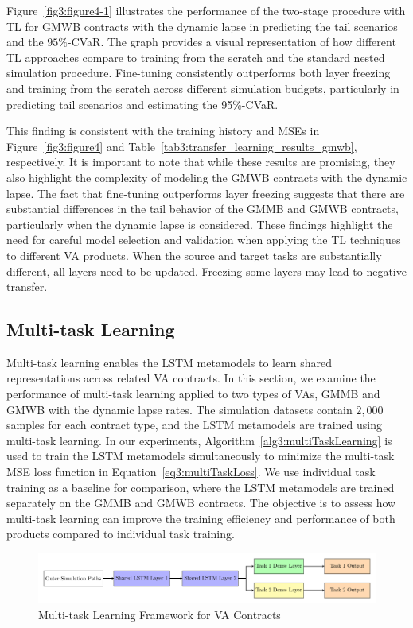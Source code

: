 Figure~\ref{fig3:figure4-1} illustrates the performance of the two-stage procedure with TL for GMWB contracts with the dynamic lapse in predicting the tail scenarios and the $95\%$-CVaR.
The graph provides a visual representation of how different TL approaches compare to training from the scratch and the standard nested simulation procedure.
Fine-tuning consistently outperforms both layer freezing and training from the scratch across different simulation budgets, particularly in predicting tail scenarios and estimating the 95\%-CVaR. 

This finding is consistent with the training history and MSEs in Figure~\ref{fig3:figure4} and Table~\ref{tab3:transfer_learning_results_gmwb}, respectively.
It is important to note that while these results are promising, they also highlight the complexity of modeling the GMWB contracts with the dynamic lapse. 
The fact that fine-tuning outperforms layer freezing suggests that there are substantial differences in the tail behavior of the GMMB and GMWB contracts, particularly when the dynamic lapse is considered. 
These findings highlight the need for careful model selection and validation when applying the TL techniques to different VA products.
When the source and target tasks are substantially different, all layers need to be updated.
Freezing some layers may lead to negative transfer.


\subsection{Multi-task Learning}

Multi-task learning enables the LSTM metamodels to learn shared representations across related VA contracts.
In this section, we examine the performance of multi-task learning applied to two types of VAs, GMMB and GMWB with the dynamic lapse rates.
The simulation datasets contain $2,\!000$ samples for each contract type, and the LSTM metamodels are trained using multi-task learning. 
In our experiments, Algorithm~\ref{alg3:multiTaskLearning} is used to train the LSTM metamodels simultaneously to minimize the multi-task MSE loss function in Equation~\eqref{eq3:multiTaskLoss}.
We use individual task training as a baseline for comparison, where the LSTM metamodels are trained separately on the GMMB and GMWB contracts.
The objective is to assess how multi-task learning can improve the training efficiency and performance of both products compared to individual task training.

\begin{figure}[ht!]
    \includegraphics[width=\textwidth]{./project3/tikz/mtl.pdf}
    \caption{Multi-task Learning Framework for VA Contracts}
    \label{fig3:mtl}
\end{figure}

